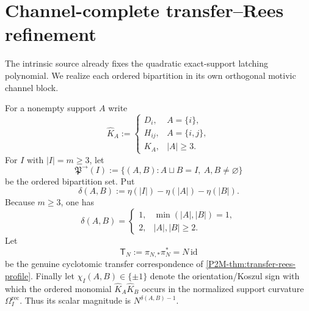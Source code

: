 \documentclass[11pt]{article}
\theoremstyle{remark}
\begin{document}
\section{Channel-complete transfer--Rees refinement}
The intrinsic source already fixes the quadratic exact-support latching
polynomial.  We realize each ordered bipartition in its own orthogonal
motivic channel block.

For a nonempty support $A$ write
\[
 \widehat K_A:=
 \begin{cases}
  D_i,&A=\{i\},\\
  H_{ij},&A=\{i,j\},\\
  K_A,&|A|\ge3.
 \end{cases}
\]
For $I$ with $|I|=m\ge3$, let
\[
 \mathfrak P^{\to}(I)
 :=\{(A,B):A\sqcup B=I,\ A,B\ne\varnothing\}
\]
be the ordered bipartition set.  Put
\[
 \delta(A,B)
 :=\eta(|I|)-\eta(|A|)-\eta(|B|).
\]
Because $m\ge3$, one has
\[
 \delta(A,B)=
 \begin{cases}
  1,&\min(|A|,|B|)=1,\\
  2,&|A|,|B|\ge2.
 \end{cases}
\]
Let
\[
 \mathsf T_N:=\pi_{N,*}\pi_N^*=N\,\mathrm{id}
\]
be the genuine cyclotomic transfer correspondence of
\cref{P2M-thm:transfer-rees-profile}.  Finally let
$\chi_I(A,B)\in\{\pm1\}$ denote the orientation/Koszul sign with which the
ordered monomial $\widehat K_A\widehat K_B$ occurs in the normalized support
curvature $\Omega_I^{\mathrm{rec}}$.  Thus its scalar magnitude is
$N^{\delta(A,B)-1}$.
\end{document}
